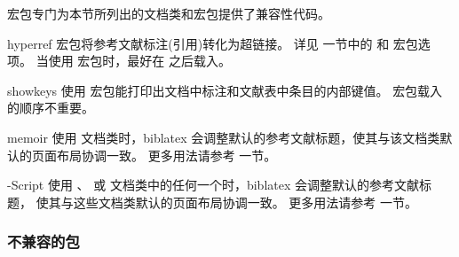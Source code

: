 
\biblatex 宏包专门为本节所列出的文档类和宏包提供了兼容性代码。

\begin{marglist}

\item[hyperref]
 宏包将参考文献标注(引用)转化为超链接。
详见   一节中的  和  宏包选项。
当使用  宏包时，最好在 \biblatex 之后载入。

\item[showkeys]
使用 宏包能打印出文档中标注和文献表中条目的内部键值。
宏包载入的顺序不重要。

\item[memoir]
使用  文档类时，biblatex 会调整默认的参考文献标题，使其与该文档类默认的页面布局协调一致。
更多用法请参考  一节。

\item[\acr{KOMA}-Script]
使用 、 或  文档类中的任何一个时，biblatex 会调整默认的参考文献标题，
使其与这些文档类默认的页面布局协调一致。
更多用法请参考  一节。
\end{marglist}

\subsubsection{不兼容的包}
\label{int:pre:inc}


